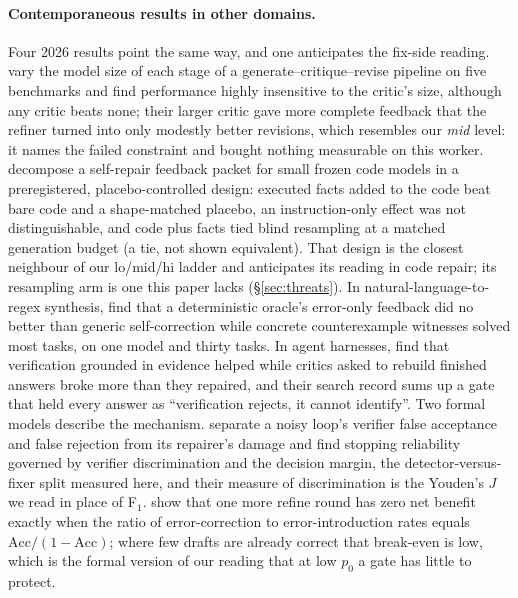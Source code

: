 \documentclass[11pt]{article}
\begin{document}
\paragraph{Contemporaneous results in other domains.}
Four 2026 results point the same way, and one anticipates the fix-side reading.
\citet{yang2026asymmetric} vary the model size of each stage of a generate--critique--revise
pipeline on five benchmarks and find performance highly insensitive to the critic's size, although
any critic beats none; their larger critic gave more complete feedback that the refiner turned into
only modestly better revisions, which resembles our \emph{mid} level: it names the failed
constraint and bought nothing measurable on this worker. \citet{iscan2026falsification} decompose a self-repair feedback packet
for small frozen code models in a preregistered, placebo-controlled design: executed facts added to
the code beat bare code and a shape-matched placebo, an instruction-only effect was not
distinguishable, and code plus facts tied blind resampling at a matched generation budget (a tie,
not shown equivalent). That
design is the closest neighbour of our lo/mid/hi ladder and anticipates its reading in code repair;
its resampling arm is one this paper lacks (\S\ref{sec:threats}). In natural-language-to-regex
synthesis, \citet{badrinarayan2026counterexamples} find that a deterministic oracle's error-only
feedback did no better than generic self-correction while concrete counterexample witnesses solved
most tasks, on one model and thirty tasks. In agent harnesses, \citet{parashar2026vestrum} find that
verification grounded in evidence helped while critics asked to rebuild finished answers broke more
than they repaired, and their search record sums up a gate that held every answer as
``verification rejects, it cannot identify''. Two formal models describe the mechanism.
\citet{wu2026vrrstop} separate a noisy loop's verifier false acceptance and false rejection from its
repairer's damage and find stopping reliability governed by verifier discrimination and the decision
margin, the detector-versus-fixer split measured here, and their measure of discrimination is the
Youden's $J$ we read in place of F$_1$. \citet{liu2026feedbackcontrol} show that one more refine
round has zero net benefit exactly when the ratio of error-correction to error-introduction rates
equals $\mathrm{Acc}/(1-\mathrm{Acc})$; where few drafts are already correct that break-even is low,
which is the formal version of our reading that at low $p_0$ a gate has little to protect.
\end{document}
